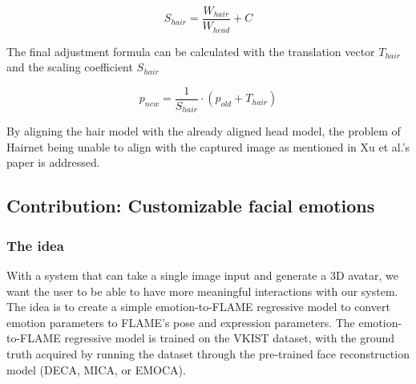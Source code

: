 \begin{equation}
    S_{hair} = \frac{W_{hair}}{W_{head}} + C
\end{equation}

The final adjustment formula can be calculated with the translation vector $T_{hair}$ and the scaling coefficient $S_{hair}$

\begin{equation}
    p_{new} = \frac{1}{S_{hair}}\cdot(p_{old} + T_{hair})
\end{equation}

By aligning the hair model with the already aligned head model, the problem of Hairnet being unable to align with the captured image as mentioned in Xu et al.'s paper \cite{xuDeep3DPortrait2020} is addressed.



\subsection{Contribution: Customizable facial emotions}

\subsubsection{The idea}

With a system that can take a single image input and generate a 3D avatar, we want the user to be able to have more meaningful interactions with our system. The idea is to create a simple emotion-to-FLAME regressive model to convert emotion parameters to FLAME's pose and expression parameters. The emotion-to-FLAME regressive model is trained on the VKIST dataset, with the ground truth acquired by running the dataset through the pre-trained face reconstruction model (DECA, MICA, or EMOCA).

